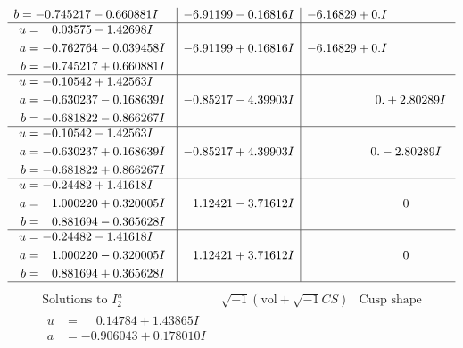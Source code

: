 \documentclass[1p]{elsarticle_modified}
\theoremstyle{definition}
\newcommand{\I}{\sqrt{-1}}
\begin{document}
$$\begin{array}{c|c|c}
\begin{aligned}
b &= -0.745217 - 0.660881 I\end{aligned}
 & -6.91199 - 0.16816 I & -6.16829 + 0. I\phantom{ +0.000000I} \\ \hline\begin{aligned}
u &= \phantom{-}0.03575 - 1.42698 I \\
a &= -0.762764 - 0.039458 I \\
b &= -0.745217 + 0.660881 I\end{aligned}
 & -6.91199 + 0.16816 I & -6.16829 + 0. I\phantom{ +0.000000I} \\ \hline\begin{aligned}
u &= -0.10542 + 1.42563 I \\
a &= -0.630237 - 0.168639 I \\
b &= -0.681822 - 0.866267 I\end{aligned}
 & -0.85217 - 4.39903 I & \phantom{-0.000000 -}0. + 2.80289 I \\ \hline\begin{aligned}
u &= -0.10542 - 1.42563 I \\
a &= -0.630237 + 0.168639 I \\
b &= -0.681822 + 0.866267 I\end{aligned}
 & -0.85217 + 4.39903 I & \phantom{-0.000000 } 0. - 2.80289 I \\ \hline\begin{aligned}
u &= -0.24482 + 1.41618 I \\
a &= \phantom{-}1.000220 + 0.320005 I \\
b &= \phantom{-}0.881694 - 0.365628 I\end{aligned}
 & \phantom{-}1.12421 - 3.71612 I & \phantom{-0.000000 } 0 \\ \hline\begin{aligned}
u &= -0.24482 - 1.41618 I \\
a &= \phantom{-}1.000220 - 0.320005 I \\
b &= \phantom{-}0.881694 + 0.365628 I\end{aligned}
 & \phantom{-}1.12421 + 3.71612 I & \phantom{-0.000000 } 0\\
 \hline 
 \end{array}$$\newpage$$\begin{array}{c|c|c}  
\text{Solutions to }I^u_{2}& \I (\text{vol} + \sqrt{-1}CS) & \text{Cusp shape}\\
 \hline 
\begin{aligned}
u &= \phantom{-}0.14784 + 1.43865 I \\
a &= -0.906043 + 0.178010 I \\

\end{aligned}
\end{array}$$
\end{document}
